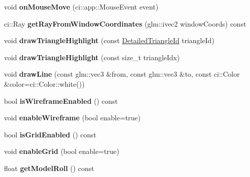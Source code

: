 \begin{DoxyCompactItemize}
void {\bfseries on\+Mouse\+Move} (ci\+::app\+::\+Mouse\+Event event)
\item 
\mbox{\label{classpepr3d_1_1_model_view_add99723c6e0ac1041b29b9a54902b157}} 
ci\+::\+Ray {\bfseries get\+Ray\+From\+Window\+Coordinates} (glm\+::ivec2 window\+Coords) const
\item 
\mbox{\label{classpepr3d_1_1_model_view_ab31d990c6c32a93af35258ce2e512db2}} 
void {\bfseries draw\+Triangle\+Highlight} (const \mbox{\hyperlink{structpepr3d_1_1_detailed_triangle_id}{Detailed\+Triangle\+Id}} triangle\+Id)
\item 
\mbox{\label{classpepr3d_1_1_model_view_a82f24b5d17a8352e76a69d87f4359d39}} 
void {\bfseries draw\+Triangle\+Highlight} (const size\+\_\+t triangle\+Idx)
\item 
\mbox{\label{classpepr3d_1_1_model_view_ae13bed5785ac370ecc80211dc5896f34}} 
void {\bfseries draw\+Line} (const glm\+::vec3 \&from, const glm\+::vec3 \&to, const ci\+::\+Color \&color=ci\+::\+Color\+::white())
\item 
\mbox{\label{classpepr3d_1_1_model_view_af9463d814c0df630235f7f7ac212eb54}} 
bool {\bfseries is\+Wireframe\+Enabled} () const
\item 
\mbox{\label{classpepr3d_1_1_model_view_ad6af1ab71ae31eb1a1e9290a1e5e45e3}} 
void {\bfseries enable\+Wireframe} (bool enable=true)
\item 
\mbox{\label{classpepr3d_1_1_model_view_af233e744e89acdc27258033377f9f14e}} 
bool {\bfseries is\+Grid\+Enabled} () const
\item 
\mbox{\label{classpepr3d_1_1_model_view_a43a0d49736a4f8b204b93594d964f308}} 
void {\bfseries enable\+Grid} (bool enable=true)
\item 
\mbox{\label{classpepr3d_1_1_model_view_a359a106369373c8e669649fac95e8cf4}} 
float {\bfseries get\+Model\+Roll} () const
\item 
\mbox{\label{classpepr3d_1_1_model_view_a91d166d8c1ff522ed0b37ba9e4a16501}} 

\end{DoxyCompactItemize}

